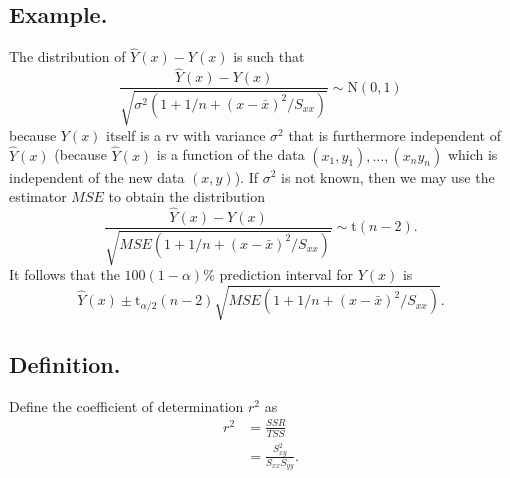 \documentclass[titlepage]{article}
\begin{document}
\subsection{Example.} The distribution of $\hat{Y}(x) - Y(x)$ is such that 
$$\frac{\hat{Y}(x) - Y(x)}{\sqrt{\sigma^{2}(1 + 1/n + (x-\bar{x})^{2}/S_{xx})}} \sim \text{N}(0, 1)$$
because $Y(x)$ itself is a rv with variance $\sigma^{2}$ that is furthermore independent of $\hat{Y}(x)$ (because $\hat{Y}(x)$ is a function of the data $(x_{1}, y_{1}), \ldots, (x_{n} y_{n})$ which is independent of the new data $(x, y)$). If $\sigma^{2}$ is not known, then we may use the estimator $MSE$ to obtain the distribution
$$\frac{\hat{Y}(x) - Y(x)}{\sqrt{MSE(1 + 1/n + (x-\bar{x})^{2}/S_{xx})}} \sim \text{t}(n-2).$$
It follows that the $100(1-\alpha)\%$ prediction interval for $Y(x)$ is 
$$\hat{Y}(x) \pm \text{t}_{\alpha/2}(n-2)\sqrt{MSE(1 + 1/n + (x-\bar{x})^{2}/S_{xx})}.$$

\subsection{Definition.} Define the coefficient of determination $r^{2}$ as 
\begin{align*}
    r^{2} &= \frac{SSR}{TSS} \\
          &= \frac{S_{xy}^{2}}{S_{xx}S_{yy}}.
\end{align*}
\end{document}
